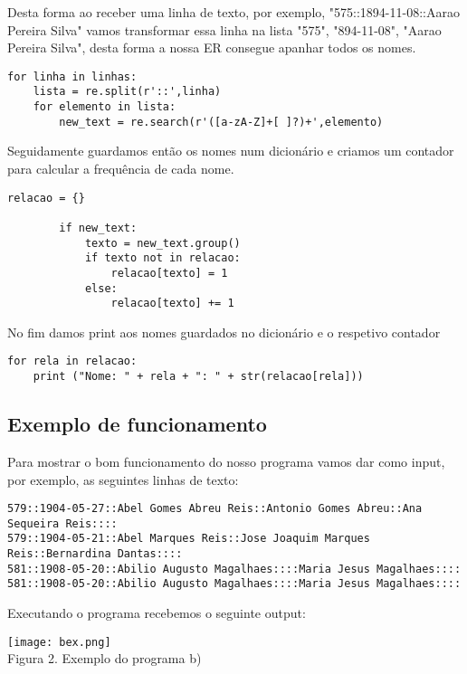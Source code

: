 \documentclass[11pt,a4paper]{report}%
\begin{document}
Desta forma ao receber uma linha de texto, por exemplo, "575::1894-11-08::Aarao Pereira Silva"  vamos transformar essa linha na lista
"575", "894-11-08", "Aarao Pereira Silva", desta forma a nossa ER consegue apanhar todos os nomes.

\begin{verbatim}
for linha in linhas: 
    lista = re.split(r'::',linha)
    for elemento in lista: 
        new_text = re.search(r'([a-zA-Z]+[ ]?)+',elemento)
\end{verbatim}

Seguidamente guardamos então os nomes num dicionário e criamos um contador para calcular a frequência de cada nome.

\begin{verbatim}
relacao = {}

        if new_text: 
            texto = new_text.group() 
            if texto not in relacao: 
                relacao[texto] = 1 
            else: 
                relacao[texto] += 1 
\end{verbatim}

No fim damos print aos nomes guardados no dicionário e o respetivo contador

\begin{verbatim}
for rela in relacao: 
    print ("Nome: " + rela + ": " + str(relacao[rela]))
\end{verbatim}

\newpage

\subsection{Exemplo de funcionamento}

Para mostrar o bom funcionamento do nosso programa vamos dar como input, por exemplo, as seguintes linhas de texto:

\begin{verbatim}
579::1904-05-27::Abel Gomes Abreu Reis::Antonio Gomes Abreu::Ana Sequeira Reis::::
579::1904-05-21::Abel Marques Reis::Jose Joaquim Marques Reis::Bernardina Dantas::::
581::1908-05-20::Abilio Augusto Magalhaes::::Maria Jesus Magalhaes::::
581::1908-05-20::Abilio Augusto Magalhaes::::Maria Jesus Magalhaes::::
\end{verbatim}

Executando o programa recebemos o seguinte output:

\begin{center}
    \texttt{[image: bex.png]}
    \\
    \caption{Figura 2. Exemplo do programa b)}
\end{center}
\end{document}

